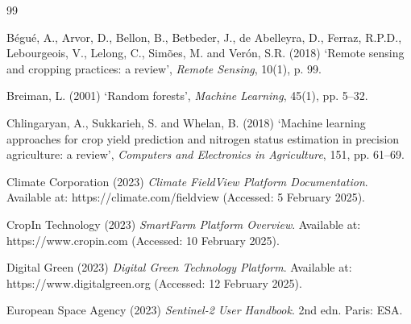 \documentclass[12pt,a4paper]{report}
\begin{document}

\setcounter{chapter}{4}   %



\clearpage
{}

\begin{thebibliography}{99}

Bégué, A., Arvor, D., Bellon, B., Betbeder, J., de Abelleyra, D., Ferraz, R.P.D., Lebourgeois, V., Lelong, C., Simões, M. and Verón, S.R. (2018) `Remote sensing and cropping practices: a review', \textit{Remote Sensing}, 10(1), p. 99.

Breiman, L. (2001) `Random forests', \textit{Machine Learning}, 45(1), pp. 5--32.

Chlingaryan, A., Sukkarieh, S. and Whelan, B. (2018) `Machine learning approaches for crop yield prediction and nitrogen status estimation in precision agriculture: a review', \textit{Computers and Electronics in Agriculture}, 151, pp. 61--69.

Climate Corporation (2023) \textit{Climate FieldView Platform Documentation}. Available at: https://climate.com/fieldview (Accessed: 5 February 2025).

CropIn Technology (2023) \textit{SmartFarm Platform Overview}. Available at: https://www.cropin.com (Accessed: 10 February 2025).

Digital Green (2023) \textit{Digital Green Technology Platform}. Available at: https://www.digitalgreen.org (Accessed: 12 February 2025).

European Space Agency (2023) \textit{Sentinel-2 User Handbook}. 2nd edn. Paris: ESA.


\end{thebibliography}
\end{document}

